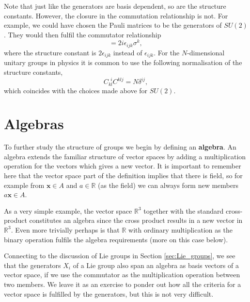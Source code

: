 \documentclass[notes.tex]{subfiles}
\begin{document}
Note that just like the generators are basis dependent, so are the structure constants. However, the closure in the commutation relationship is not. For example, we could have chosen the Pauli matrices to be the generators of $SU(2)$. They would then fulfil the commutator relationship
\begin{equation*}
[\sigma_i,\sigma_j]=2i\epsilon_{ijk}\sigma^k, 
\label{eq:pauli_algebra}
\end{equation*}
where the structure constant is $2\epsilon_{ijk}$ instead of $\epsilon_{ijk}$. For the $N$-dimensional unitary groups in physics it is common to use the following normalisation of the structure constants,
\begin{equation}
C_{kl}^{~~i}C_{}^{klj}=N\delta^{ij},
\label{eq:generator_normalisation}
\end{equation}
which coincides with the choices made above for $SU(2)$.


\section{Algebras}
\label{sec:algebras}

To further study the structure of groups we begin by defining an {\bf algebra}. An algebra extends the familiar structure of vector spaces by adding a multiplication operation for the vectors which gives a new vector.
It is important to remember here that the vector space part of the definition implies that there is field, so for example from $\mathbf x\in A$ and $a\in \mathbb{R}$ (as the field) we can always form new members $a\mathbf x\in A$.

As a very simple example, the vector space $\mathbb{R}^3$ together with the standard cross-product constitutes an algebra since the cross product results in a new vector in  $\mathbb{R}^3$. Even more trivially perhaps is that $\mathbb{R}$ with ordinary multiplication as the binary operation fulfils the algebra requirements (more on this case below).

Connecting to the discussion of Lie groups in Section \ref{sec:Lie_groups}, we see that the generators $X_i$ of a Lie group also span an algebra as basis vectors of a vector space, if we use the commutator as  the multiplication operation between two members. We leave it as an exercise to ponder out how all the criteria for a vector space is fulfilled by the generators, but this is not very difficult.
\end{document}

